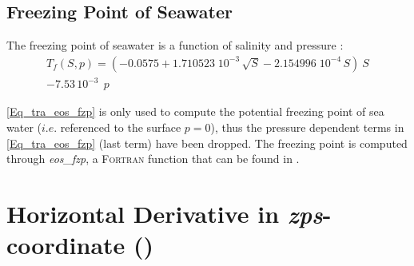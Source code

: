 
%

\subsection   [Freezing Point of Seawater]
			{Freezing Point of Seawater}
\label{TRA_fzp}

The freezing point of seawater is a function of salinity and pressure \citep{UNESCO1983}:
\begin{equation} \label{Eq_tra_eos_fzp}
   \begin{split}
T_f (S,p) = \left( -0.0575 + 1.710523 \;10^{-3} \, \sqrt{S} 
						     -  2.154996 \;10^{-4} \,S  \right) \ S    \\
               - 7.53\,10^{-3} \ \ p 
   \end{split}
\end{equation}

\eqref{Eq_tra_eos_fzp} is only used to compute the potential freezing point of 
sea water ($i.e.$ referenced to the surface $p=0$), thus the pressure dependent 
terms in \eqref{Eq_tra_eos_fzp} (last term) have been dropped. The freezing
point is computed through \textit{eos\_fzp}, a \textsc{Fortran} function that can be found 
in .  

\section  [Horizontal Derivative in \textit{zps}-coordinate (\textit{zpshde})]
		{Horizontal Derivative in \textit{zps}-coordinate ()}
\label{TRA_zpshde}

